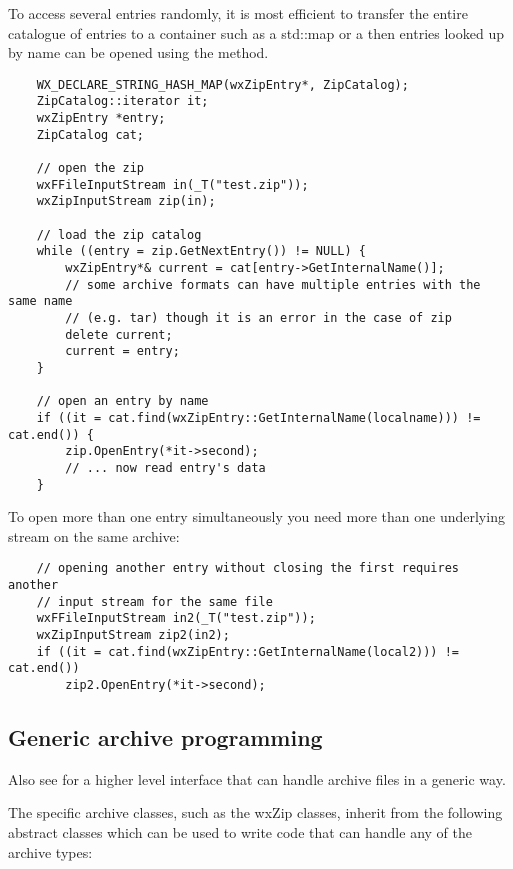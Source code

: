 To access several entries randomly, it is most efficient to transfer the
entire catalogue of entries to a container such as a std::map or a
  then entries looked up by name can be
opened using the  method.

\begin{verbatim}
    WX_DECLARE_STRING_HASH_MAP(wxZipEntry*, ZipCatalog);
    ZipCatalog::iterator it;
    wxZipEntry *entry;
    ZipCatalog cat;

    // open the zip
    wxFFileInputStream in(_T("test.zip"));
    wxZipInputStream zip(in);

    // load the zip catalog
    while ((entry = zip.GetNextEntry()) != NULL) {
        wxZipEntry*& current = cat[entry->GetInternalName()];
        // some archive formats can have multiple entries with the same name
        // (e.g. tar) though it is an error in the case of zip
        delete current;
        current = entry;
    }

    // open an entry by name
    if ((it = cat.find(wxZipEntry::GetInternalName(localname))) != cat.end()) {
        zip.OpenEntry(*it->second);
        // ... now read entry's data
    }

\end{verbatim}

To open more than one entry simultaneously you need more than one
underlying stream on the same archive:

\begin{verbatim}
    // opening another entry without closing the first requires another
    // input stream for the same file
    wxFFileInputStream in2(_T("test.zip"));
    wxZipInputStream zip2(in2);
    if ((it = cat.find(wxZipEntry::GetInternalName(local2))) != cat.end())
        zip2.OpenEntry(*it->second);

\end{verbatim}


\subsection{Generic archive programming}\label{wxarcgeneric}


Also see  for a higher level interface that
can handle archive files in a generic way.

The specific archive classes, such as the wxZip classes, inherit from
the following abstract classes which can be used to write code that can
handle any of the archive types:

